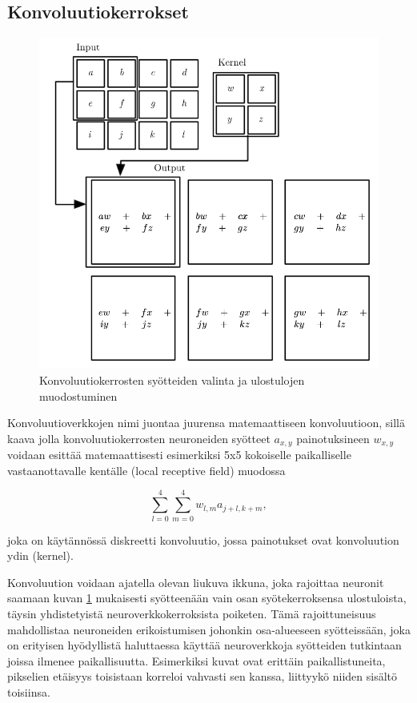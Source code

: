 \documentclass[finnish]{tktltiki2}
\theoremstyle{definition}
\theoremstyle{remark}
\begin{document}
    \subsection{Konvoluutiokerrokset}
    
    \begin{figure}[h]
      \centering
      \includegraphics[scale=0.4]{convolution}
      \caption{Konvoluutiokerrosten syötteiden valinta ja ulostulojen muodostuminen \cite{Goodfellow-et-al-2016}}
      \label{pic:convolution}
    \end{figure}

    Konvoluutioverkkojen nimi juontaa juurensa matemaattiseen konvoluutioon, sillä kaava jolla konvoluutiokerrosten neuroneiden syötteet $a_{x,y}$ painotuksineen $w_{x,y}$ voidaan esittää matemaattisesti esimerkiksi 5x5 kokoiselle paikalliselle vastaanottavalle kentälle (local receptive field) muodossa

    $$ \sum_{l=0}^{4}\sum_{m=0}^{4} w_{l,m}a_{j+l,k+m},$$
    
    joka on käytännössä diskreetti konvoluutio, jossa painotukset ovat konvoluution ydin (kernel).

    Konvoluution voidaan ajatella olevan liukuva ikkuna, joka rajoittaa neuronit saamaan kuvan \ref{pic:convolution} mukaisesti syötteenään vain osan syötekerroksensa ulostuloista, täysin yhdistetyistä neuroverkkokerroksista poiketen. Tämä rajoittuneisuus mahdollistaa neuroneiden erikoistumisen johonkin osa-alueeseen syötteissään, joka on erityisen hyödyllistä haluttaessa käyttää neuroverkkoja syötteiden tutkintaan joissa ilmenee paikallisuutta. Esimerkiksi kuvat ovat erittäin paikallistuneita, pikselien etäisyys toisistaan korreloi vahvasti sen kanssa, liittyykö niiden sisältö toisiinsa.
\end{document}
